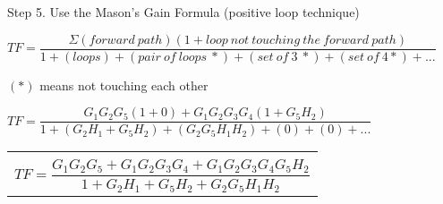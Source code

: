 \documentclass[11pt,letterpaper]{article}
\begin{document}
Step 5. Use the Mason’s Gain Formula (positive loop technique)\\
\begin{center}
	$TF=\dfrac{\Sigma (forward~path)(1 + loop~not~touching~the~forward~path)}{1 + (loops) + (pair~of~loops~*) + (set~of~3~*) + (set~of~4*) + ...}$
\end{center}
$(*)$ means not touching each other\\
\begin{center}
	$TF=\dfrac{G_1G_2G_5(1+0)+G_1G_2G_3G_4(1+G_5H_2)}{1+(G_2H_1+G_5H_2)+(G_2G_5H_1H_2)+(0)+(0)+...}$\\[12pt]
	\begin{tabular}{|c|}
		\hline \\
	$TF=\dfrac{G_1G_2G_5+G_1G_2G_3G_4+G_1G_2G_3G_4G_5H_2}{1+G_2H_1+G_5H_2+G_2G_5H_1H_2}$\\[12pt]
	\hline
	\end{tabular}
\end{center}
\clearpage
\end{document}
